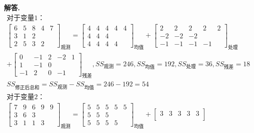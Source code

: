 \documentclass[12pt, a4paper, oneside]{ctexart}
\newenvironment{solution}{\par\noindent\textbf{解答. }}{\par}
\begin{document}
\begin{solution}
    \[
    \begin{gathered}
        \text{对于变量1：}\\
        \begin{bmatrix}
            6 & 5 & 8 & 4 & 7 \\
            3 & 1 & 2 &  &  \\
            2 & 5 & 3 &2 &  
        \end{bmatrix}_{\text{观测}}=
        \begin{bmatrix}
            4 & 4 & 4 & 4 & 4 \\
            4 & 4 & 4 &  &  \\
            4 & 4 & 4 & 4 &
        \end{bmatrix}_{\text{均值}}+
        \begin{bmatrix}
            2 & 2 & 2 & 2 & 2 \\
            -2 & -2 & -2 &  &  \\
            -1 & -1 & -1 & -1 &
        \end{bmatrix}_{\text{处理}}\\
        +
        \begin{bmatrix}
            0 & -1 & 2 & -2 & 1 \\
            1 & -1 & 0 &  &  \\
            -1 & 2 & 0 & -1 &
        \end{bmatrix}_{\text{残差}},
        {SS}_{\text{观测}}=246, {SS}_{\text{均值}}=192, {SS}_{\text{处理}}=36, {SS}_{\text{残差}}=18\\
        {SS}_\text{修正后总和}={SS}_{\text{观测}}-{SS}_{\text{均值}}=246-192=54\\
        \text{对于变量2：}\\
        \begin{bmatrix}
            7 & 9 & 6 & 9 & 9 \\
            3 & 6 & 3 &  &  \\
            3 & 1 & 1 & 3 &
        \end{bmatrix}_{\text{观测}}=
        \begin{bmatrix}
            5 & 5 & 5 & 5 & 5 \\
            5 & 5 & 5 &  &  \\
            5 & 5 & 5 & 5 &
        \end{bmatrix}_{\text{均值}}+
        \begin{bmatrix}
            3 & 3 & 3 & 3 & 3 \\

\end{bmatrix}
\end{gathered}\]
\end{solution}
\end{document}
